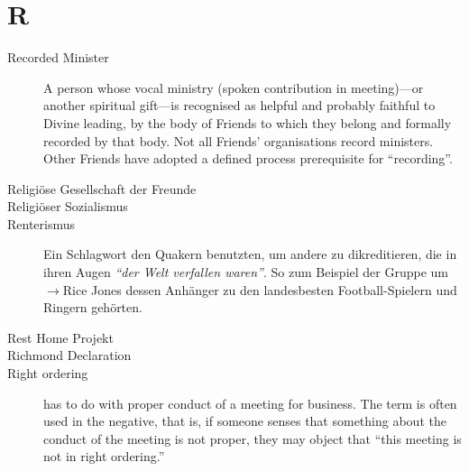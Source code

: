 \section*{R}

\articlesize

\begin{description}

 \item[Recorded Minister]
    A person whose vocal ministry (spoken contribution in meeting)—or another spiritual gift—is recognised as helpful and probably faithful to Divine leading, by the body of Friends to which they belong and formally recorded by that body. Not all Friends' organisations record ministers. Other Friends have adopted a defined process prerequisite for "`recording"'.
 

 \item[Religiöse Gesellschaft der Freunde]

  \item[Religiöser Sozialismus]

 \item[Renterismus] Ein Schlagwort den Quakern benutzten, um andere zu dikreditieren, die in ihren Augen \textit{"`der Welt verfallen waren"'}. So zum Beispiel der Gruppe um   $\to$Rice Jones dessen Anhänger zu den landesbesten Football-Spielern und Ringern gehörten.

 \item[Rest Home Projekt]

 \item[Richmond Declaration]

 \item[Right ordering]
    has to do with proper conduct of a meeting for business. The term is often used in the negative, that is, if someone senses that something about the conduct of the meeting is not proper, they may object that "`this meeting is not in right ordering."'

 \end{description}

\normalsize
